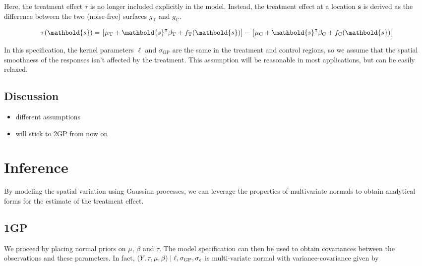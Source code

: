 \documentclass[letter]{article}
\providecommand{\tightlist}{%
      \setlength{\itemsep}{0pt}\setlength{\parskip}{0pt}}
\newcommand{\trans}{^{\intercal}}
\newcommand{\treat}{\mathrm{T}}
\newcommand{\ctrol}{\mathrm{C}}
\newcommand{\sigmaf}{\sigma_{\mathrm{GP}}}
\newcommand{\sigman}{\sigma_{\epsilon}}
\newcommand{\svec}{\mathbold{s}}
\providecommand{\tightlist}{%
  	  \setlength{\itemsep}{0pt}\setlength{\parskip}{0pt}}
\begin{document}
Here, the treatment effect \(\tau\) is no longer included explicitly in the model. Instead, the treatment effect at a location \(\svec\) is derived as the difference between the two (noise-free) surfaces \(g_\treat{}\) and \(g_\ctrol{}\).

\begin{equation}
\tau(\svec) = \sbr{\mu_\treat{} + \svec\trans\beta_\treat{} + f_\treat{}(\svec)} - \sbr{\mu_\ctrol{} + \svec\trans\beta_\ctrol{} + f_\ctrol{}(\svec)}
\end{equation}

In this specification, the kernel parameters \(\ell\) and \(\sigmaf\) are the same in the treatment and control regions, so we assume that the spatial smoothness of the responses isn't affected by the treatment. This assumption will be reasonable in most applications, but can be easily relaxed.
    


    	\subsection{Discussion}\label{discussion}

\begin{itemize}
\tightlist
\item
  different assumptions
\item
  will stick to 2GP from now on
\end{itemize}
    


    	\section{Inference}\label{inference}

By modeling the spatial variation using Gaussian processes, we can leverage the properties of multivariate normals to obtain analytical forms for the estimate of the treatment effect.
    


    	\subsection{1GP}\label{gp}

We proceed by placing normal priors on \(\mu\), \(\beta\) and \(\tau\). The model specification can then be used to obtain covariances between the observations and these parameters. In fact, \(\del{Y,\tau,\mu,\beta} \mid \ell,\sigmaf, \sigman\) is multi-variate normal with variance-covariance given by
\end{document}
